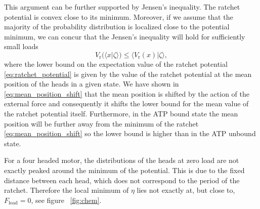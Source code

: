 \documentclass[aps,pre,twocolumn,showpacs,showkeys,superscriptaddress,floatfix]{revtex4-1}
\begin{document}
This argument can be further supported by Jensen's inequality.
The ratchet potential is convex close to its minimum. 
Moreover, if we assume that the majority of the probability distribution is localized close to the potential minimum,
we can concur that the Jensen's inequality will hold for sufficiently small loads  
\begin{equation*}
V_\text{r}(\langle x | \zeta \rangle) \leq \langle V_\text{r}(x) | \zeta \rangle , 
\end{equation*} 
where the lower bound on the expectation value of the ratchet potential \eqref{eq:ratchet_potential} is given by the value of the ratchet potential at the mean position of the heads in a given state. 
We have shown in \eqref{eq:mean_position_shift} that the mean position is shifted by the action of the external force and consequently it shifts the lower bound for the mean value of the ratchet potential itself. 
Furthermore, in the ATP bound state the mean position will be further away from the minimum of the ratchet \eqref{eq:mean_position_shift} so the lower bound is higher than in the ATP unbound state.

For a four headed motor, the distributions of the heads at zero load are not exactly peaked around the minimum of the potential. 
This is due to the fixed distance between each head, which does not correspond to the period of the ratchet. 
Therefore the local minimum of $\eta$ lies not exactly at, but close to, $F_\text{load} =0$, see figure ~\ref{fig:chem}.
\end{document}
